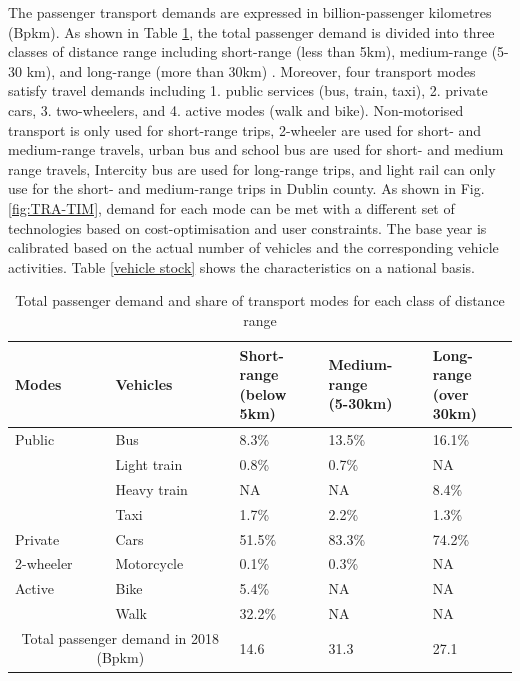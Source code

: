 \documentclass[journal abbreviation, manuscript]{copernicus}
\begin{document}
The passenger transport demands are expressed in billion-passenger kilometres (Bpkm). As shown in Table \ref{passenger transport demand}, the total passenger demand is divided into three classes of distance range including short-range (less than 5km), medium-range (5-30 km), and long-range (more than 30km) \citep{NTA2018}. Moreover, four transport modes satisfy travel demands including 1. public services (bus, train, taxi), 2. private cars, 3. two-wheelers, and 4. active modes (walk and bike). Non-motorised transport is only used for short-range trips, 2-wheeler are used for short- and medium-range travels, urban bus and school bus are used for short- and medium range travels, Intercity bus are used for long-range trips, and light rail can only use for the short- and medium-range trips in Dublin county. As shown in Fig. \ref{fig:TRA-TIM}, demand for each mode can be met with a different set of technologies based on cost-optimisation and user constraints. The base year is calibrated based on the actual number of vehicles and the corresponding vehicle activities. Table \ref{vehicle stock} shows the characteristics on a national basis. 

\begin{table}[h!]
 \centering
 \footnotesize
 \caption{Total passenger demand and share of transport modes for each class of distance range \citep{CentralStatisticsOffice2020a, CentralStatisticsOffice2020b, CentralStatisticsOffice2020c, CentralStatisticsOffice2020d, CentralStatisticsOffice2020e, CentralStatisticsOffice2017}}
 \begin{tabular}{lllll}
 \hline 
 Modes & Vehicles & \makecell{Short-range \\ (below 5km)} & \makecell{Medium-range \\ (5-30km)} & \makecell{Long-range \\ (over 30km)} \\ 
 \hline
 Public & Bus & 8.3\% &	13.5\% &	16.1\% \\
 & Light train &	0.8\% &	0.7\% &	NA \\
 & Heavy train &	NA & NA &	8.4\% \\
 & Taxi &	1.7\% &	2.2\% &	1.3\% \\
 \hline
 Private & Cars	& 51.5\% &	83.3\%	& 74.2\% \\
 \hline
 2-wheeler & Motorcycle & 0.1\% &	0.3\%	& NA \\
 \hline
 Active & Bike &	5.4\% & 	NA & 	NA \\
 
 & Walk &	32.2\% &	NA &	NA \\
 \hline
 \multicolumn{2}{c}{Total passenger demand in 2018 (Bpkm)} &	14.6 &	31.3 &	27.1 \\ [1ex]
 \hline
 \end{tabular}
 
 \label{passenger transport demand}
\end{table}
\end{document}
